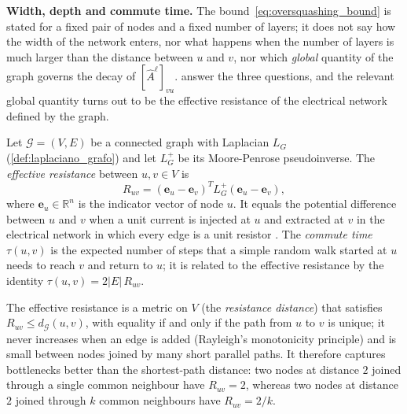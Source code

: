 \textbf{Width, depth and commute time.} The bound~\eqref{eq:oversquashing_bound} is stated for a fixed pair of nodes and a fixed number of layers; it does not say how the width of the network enters, nor what happens when the number of layers is much larger than the distance between $u$ and $v$, nor which \textit{global} quantity of the graph governs the decay of $[\hat{A}^\ell]_{vu}$. \citet{digiovanni2023oversquashing} answer the three questions, and the relevant global quantity turns out to be the effective resistance of the electrical network defined by the graph.

\begin{definition}\label{def:resistencia_efectiva}
	Let $\mathcal{G} = (V, E)$ be a connected graph with Laplacian $L_G$ (\autoref{def:laplaciano_grafo}) and let $L_G^{+}$ be its Moore-Penrose pseudoinverse. The \textit{effective resistance} between $u, v \in V$ is
	\[
		R_{uv} = (\mathbf{e}_u - \mathbf{e}_v)^T L_G^{+} (\mathbf{e}_u - \mathbf{e}_v),
	\]
	where $\mathbf{e}_u \in \mathbb{R}^{n}$ is the indicator vector of node $u$. It equals the potential difference between $u$ and $v$ when a unit current is injected at $u$ and extracted at $v$ in the electrical network in which every edge is a unit resistor \citep{doyle1984random}. The \textit{commute time} $\tau(u,v)$ is the expected number of steps that a simple random walk started at $u$ needs to reach $v$ and return to $u$; it is related to the effective resistance by the identity $\tau(u,v) = 2|E|\, R_{uv}$.
\end{definition}

The effective resistance is a metric on $V$ (the \textit{resistance distance}) that satisfies $R_{uv} \leq d_{\mathcal{G}}(u,v)$, with equality if and only if the path from $u$ to $v$ is unique; it never increases when an edge is added (Rayleigh's monotonicity principle) and is small between nodes joined by many short parallel paths. It therefore captures bottlenecks better than the shortest-path distance: two nodes at distance $2$ joined through a single common neighbour have $R_{uv} = 2$, whereas two nodes at distance $2$ joined through $k$ common neighbours have $R_{uv} = 2/k$.


